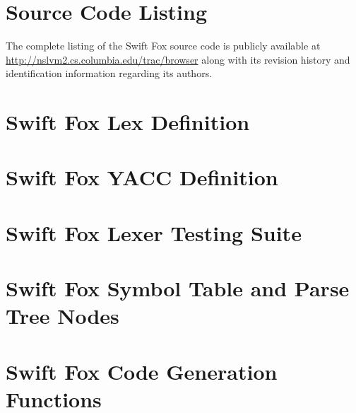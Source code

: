 \appendix
\label{app:code_listings}

\section{Source Code Listing}

The complete listing of the Swift Fox source code is publicly available at 
\url{http://nslvm2.cs.columbia.edu/trac/browser} along with its revision
history and identification information regarding its authors.


\section{Swift Fox Lex Definition}
\label{sec:lex}



\section{Swift Fox YACC Definition}
\label{sec:yacc}



\section{Swift Fox Lexer Testing Suite}
\label{sec:lex_testing_suite}



\section{Swift Fox Symbol Table and Parse Tree Nodes}
\label{sec:swift_fox_header}



\section{Swift Fox Code Generation Functions}
\label{sec:code_generation}




